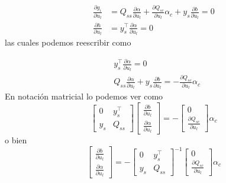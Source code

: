 \documentclass[letterpaper,12pt,oneside]{book}
\begin{document}
{{{{    
    \begin{align*}
        \frac{\partial g_i}{\partial u_l} &=Q_{ss} \frac{\partial \alpha}{\partial u_l} + \frac{\partial Q_{sc}}{\partial u_l} \alpha_c + y_s \frac{\partial b}{\partial u_l} =0\\
        \frac{\partial h}{\partial u_l} &= y_{s}^{\top} \frac{\partial \alpha}{\partial u_l} = 0
    \end{align*}  
    las cuales podemos reescribir como 
    
    \begin{align*}
        & y_{s}^{\top} \frac{\partial \alpha}{\partial u_l} = 0 \\
        &Q_{ss} \frac{\partial \alpha}{\partial u_l} +  y_s \frac{\partial b}{\partial u_l} = -\frac{\partial Q_{sc}}{\partial u_l} \alpha_c
    \end{align*}  
    En notación matricial lo podemos ver como 
    \begin{equation*}
        \begin{bmatrix}
        0 & y_{s}^{\top} \\
        y_{s} & Q_{ss}
        \end{bmatrix}
        \begin{bmatrix}
        \frac{\partial b}{\partial u_l} \\
        \frac{\partial \alpha}{\partial u_l}
        \end{bmatrix}
        =-
        \begin{bmatrix}
        0 \\
       \frac{\partial Q_{sc}}{\partial u_l} 
        \end{bmatrix}\alpha_c
    \end{equation*}
    o bien 
    \begin{equation}
        \begin{bmatrix}
        \frac{\partial b}{\partial u_l} \\
        \frac{\partial \alpha}{\partial u_l}
        \end{bmatrix}
        =- \begin{bmatrix}
        0 & y_{s}^{\top} \\
        y_{s} & Q_{ss}
        \end{bmatrix}^{-1} 
        \begin{bmatrix}
        0 \\
       \frac{\partial Q_{sc}}{\partial u_l} 
        \end{bmatrix}\alpha_c \label{eq: 4.3}
    \end{equation}
}}}}
\end{document}
